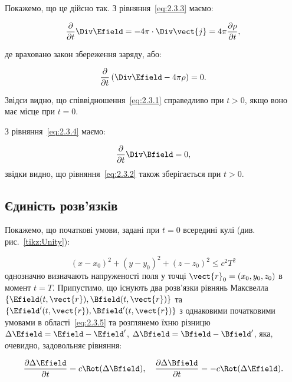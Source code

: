 Покажемо, що це дійсно так. З рівняння~\eqref{eq:2.3.3} маємо:

\[
\frac{\partial}{\partial t} \Div \Efield = -4\pi \cdot \Div \vect{j} = 4\pi \frac{\partial \rho}{\partial t},
\]

де враховано закон збереження заряду, або:

\[
\frac{\partial}{\partial t} \left(\Div \Efield - 4\pi\rho \right) = 0.
\]

Звідси видно, що співвідношення~\eqref{eq:2.3.1} справедливо при \( t > 0 \), якщо воно має місце при \( t = 0 \).

З рівняння~\eqref{eq:2.3.4} маємо:

\[
\frac{\partial}{\partial t} \Div \Bfield = 0,
\]
звідки видно, що рівняння~\eqref{eq:2.3.2} також зберігається при \( t > 0 \).

\subsection*{Єдиність розв’язків}



Покажемо, що початкові умови, задані при \( t = 0 \) всередині кулі (див. рис.~\ref{tikz:Unity}):

\begin{equation}
(x - x_0)^2 + (y - y_0)^2 + (z - z_0)^2 \leqslant c^2 T^2 \label{eq:2.3.5}
\end{equation}
однозначно визначають напруженості поля у точці \( \vect{r}_0 = (x_0, y_0, z_0) \) в момент \( t = T \). Припустимо, що існують два розв’язки рівнянь
Максвелла \( \{\Efield(t, \vect{r}), \Bfield(t, \vect{r})\} \) та \( \{\Efield'(t, \vect{r}), \Bfield'(t, \vect{r})\} \) з однаковими початковими
умовами в області~\eqref{eq:2.3.5} та розглянемо їхню різницю \( \Delta \Efield = \Efield - \Efield' \), \( \Delta \Bfield = \Bfield - \Bfield'
\), яка, очевидно, задовольняє рівняння:

\begin{equation*}
\frac{\partial \Delta \Efield}{\partial t} = c  \Rot(\Delta \Bfield), \quad \frac{\partial \Delta \Bfield}{\partial t} = -c
\Rot(\Delta \Efield).
\end{equation*}

